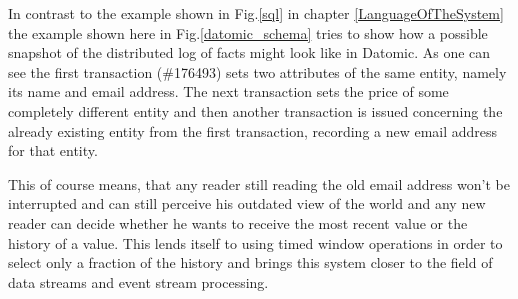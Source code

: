 In contrast to the example shown in Fig.\ref{sql} in
chapter \ref{LanguageOfTheSystem} the example shown here in
Fig.\ref{datomic_schema} tries to show how a possible snapshot of
the distributed log of facts might look like in Datomic. As one
can see the first transaction (\#176493) sets two attributes of
the same entity, namely its name and email address. The next
transaction sets the price of some completely different entity
and then another transaction is issued concerning the already
existing entity from the first transaction, recording a new email
address for that entity.

This of course means, that any reader still reading the old
email address won't be interrupted and can still perceive his
outdated view of the world and any new reader can decide whether
he wants to receive the most recent value or the history of a
value. This lends itself to using timed window operations in order
to select only a fraction of the history and brings this system
closer to the field of data streams and event stream processing.



